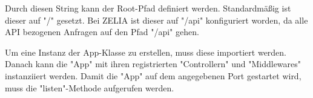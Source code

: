 
Durch diesen String kann der Root-Pfad definiert werden. Standardmäßig ist dieser auf "{\ttfamily /}" gesetzt. Bei ZELIA ist dieser auf "{\ttfamily /api}" konfiguriert worden, da alle API bezogenen Anfragen auf den Pfad "{\ttfamily /api}" gehen.

Um eine Instanz der App-Klasse zu erstellen, muss diese importiert werden. Danach kann die "App" mit ihren registrierten "Controllern" und "Middlewares" instanziiert werden. Damit die "App" auf dem angegebenen Port gestartet wird, muss die "listen"-Methode aufgerufen werden.

